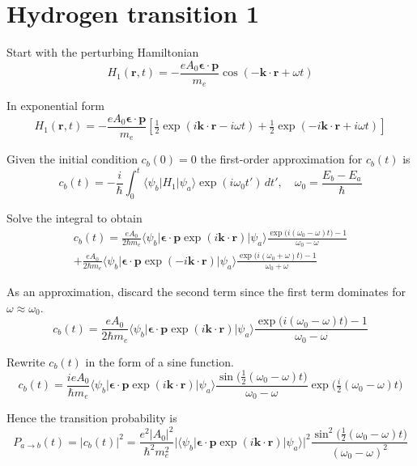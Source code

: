 

\section*{Hydrogen transition 1}

Start with the perturbing Hamiltonian
\begin{equation*}
H_1(\mathbf r,t)=-\frac{eA_0\boldsymbol{\epsilon}\cdot\mathbf p}{m_e}
\cos(-\mathbf k\cdot\mathbf r+\omega t)
\end{equation*}

In exponential form
\begin{equation*}
H_1(\mathbf r,t)=-\frac{eA_0\boldsymbol{\epsilon}\cdot\mathbf p}{m_e}
\left[\tfrac{1}{2}\exp(i\mathbf k\cdot\mathbf r-i\omega t)
+\tfrac{1}{2}\exp(-i\mathbf k\cdot\mathbf r+i\omega t)\right]
\end{equation*}

Given the initial condition $c_b(0)=0$ the first-order approximation for $c_b(t)$ is
\begin{equation*}
c_b(t)=-\frac{i}{\hbar}\int_0^t
\langle\psi_b|H_1|\psi_a\rangle\exp(i\omega_0t')\,dt',\quad
\omega_0=\frac{E_b-E_a}{\hbar}
\end{equation*}

Solve the integral to obtain
\begin{multline*}
c_b(t)=\frac{eA_0}{2\hbar m_e}
\langle\psi_b|\boldsymbol{\epsilon}\cdot\mathbf p\exp(i\mathbf k\cdot\mathbf r)|\psi_a\rangle
\frac{\exp\bigl(i(\omega_0-\omega)t\bigr)-1}{\omega_0-\omega}
\\
+\frac{eA_0}{2\hbar m_e}
\langle\psi_b|\boldsymbol{\epsilon}\cdot\mathbf p\exp(-i\mathbf k\cdot\mathbf r)|\psi_a\rangle
\frac{\exp\bigl(i(\omega_0+\omega)t\bigr)-1}{\omega_0+\omega}
\tag{1}
\end{multline*}

As an approximation, discard the second term since the first term
dominates for $\omega\approx\omega_0$.
\begin{equation*}
c_b(t)=\frac{eA_0}{2\hbar m_e}
\langle\psi_b|\boldsymbol{\epsilon}\cdot\mathbf p\exp(i\mathbf k\cdot\mathbf r)|\psi_a\rangle
\frac{\exp\bigl(i(\omega_0-\omega)t\bigr)-1}{\omega_0-\omega}
\end{equation*}

Rewrite $c_b(t)$ in the form of a sine function.
\begin{equation*}
c_b(t)=\frac{ieA_0}{\hbar m_e}
\langle\psi_b|\boldsymbol{\epsilon}\cdot\mathbf p\exp(i\mathbf k\cdot\mathbf r)|\psi_a\rangle
\frac{\sin\bigl(\tfrac{1}{2}(\omega_0-\omega)t\bigr)}{\omega_0-\omega}
\exp\bigl(\tfrac{i}{2}(\omega_0-\omega)t\bigr)
\tag{2}
\end{equation*}

Hence the transition probability is
\begin{equation*}
P_{a\rightarrow b}(t)=|c_b(t)|^2=\frac{e^2|A_0|^2}{\hbar^2m_e^2}
\bigl|\langle\psi_b|\boldsymbol{\epsilon}\cdot\mathbf p\exp(i\mathbf k\cdot\mathbf r)|\psi_a\rangle\bigr|^2
\frac{\sin^2\bigl(\tfrac{1}{2}(\omega_0-\omega)t\bigr)}{(\omega_0-\omega)^2}
\end{equation*}


